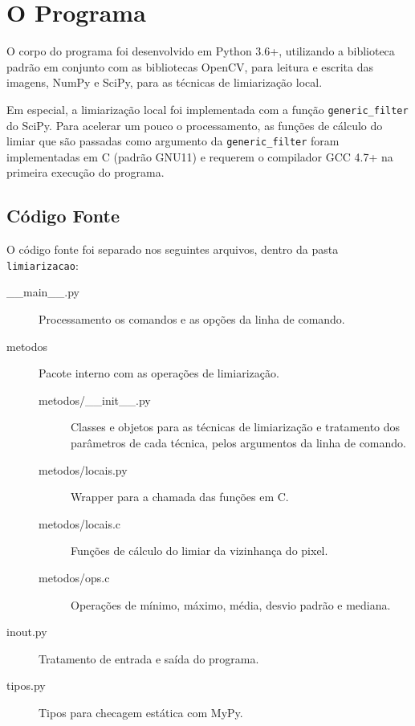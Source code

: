 \section{O Programa}

O corpo do programa foi desenvolvido em Python 3.6+, utilizando a biblioteca padrão em conjunto com as bibliotecas OpenCV, para leitura e escrita das imagens, NumPy e SciPy, para as técnicas de limiarização local.

Em especial, a limiarização local foi implementada com a função \texttt{generic_filter} \autocite{ref:genericfilter} do SciPy. Para acelerar um pouco o processamento, as funções de cálculo do limiar que são passadas como argumento da \texttt{generic_filter} foram implementadas em C (padrão GNU11) e requerem o compilador GCC 4.7+ na primeira execução do programa.

\subsection{Código Fonte}

    O código fonte foi separado nos seguintes arquivos, dentro da pasta \texttt{limiarizacao}:

    \begin{description}
        \item[\_\_main\_\_.py] Processamento os comandos e as opções da linha de comando.

        \item[metodos] Pacote interno com as operações de limiarização.

        \begin{description}
            \item[metodos/\_\_init\_\_.py] Classes e objetos para as técnicas de limiarização e tratamento dos parâmetros de cada técnica, pelos argumentos da linha de comando.

            \item[metodos/locais.py] Wrapper para a chamada das funções em C.

            \item[metodos/locais.c] Funções de cálculo do limiar da vizinhança do pixel.

            \item[metodos/ops.c] Operações de mínimo, máximo, média, desvio padrão e mediana.
        \end{description}

        \item[inout.py] Tratamento de entrada e saída do programa.

        \item[tipos.py] Tipos para checagem estática com MyPy.
    \end{description}

